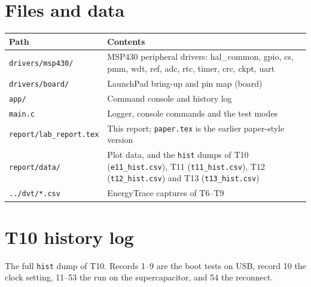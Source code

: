 \documentclass[11pt,a4paper]{article}
\newcommand{\code}[1]{\texttt{#1}}
\begin{document}
\section{Files and data}

\begin{table}[H]
\centering\small
\begin{tabularx}{\textwidth}{@{}lL@{}}
\toprule
Path & Contents \\
\midrule
\code{drivers/msp430/} & MSP430 peripheral drivers: hal\_common, gpio, cs, pmm, wdt, ref, adc, rtc, timer, crc, ckpt, uart \\
\code{drivers/board/} & LaunchPad bring-up and pin map (board) \\
\code{app/} & Command console and history log \\
\code{main.c} & Logger, console commands and the test modes \\
\code{report/lab\_report.tex} & This report; \code{paper.tex} is the earlier paper-style version \\
\code{report/data/} & Plot data, and the \code{hist} dumps of T10 (\code{e11\_hist.csv}), T11 (\code{t11\_hist.csv}), T12 (\code{t12\_hist.csv}) and T13 (\code{t13\_hist.csv}) \\
\code{../dvt/*.csv} & EnergyTrace captures of T6--T9 \\
\bottomrule
\end{tabularx}
\end{table}

\section{T10 history log}

The full \code{hist} dump of T10. Records 1--9 are the boot tests on USB, record 10 the clock setting, 11--53 the run on the supercapacitor, and 54 the reconnect.
\end{document}
